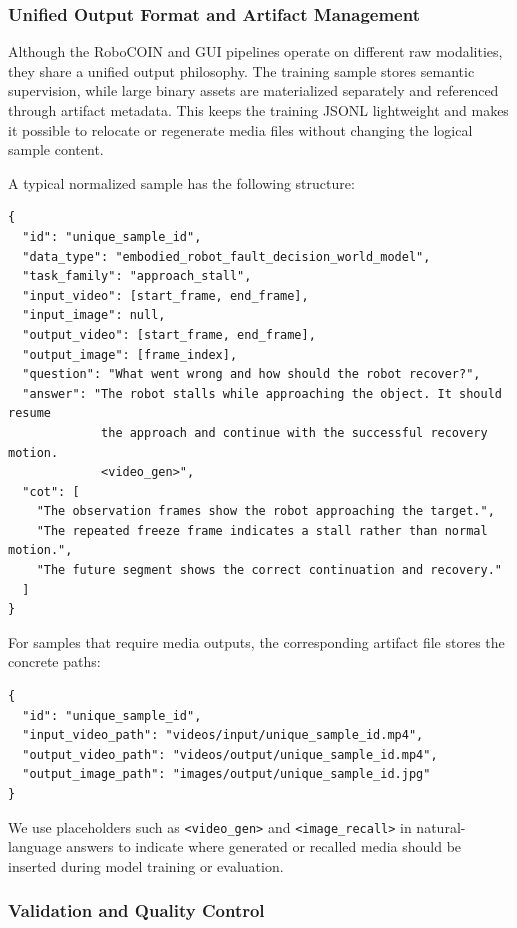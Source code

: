 \documentclass{llmxive}
\begin{document}
\subsubsection{Unified Output Format and Artifact Management}
\label{app:unified_output}

Although the RoboCOIN and GUI pipelines operate on different raw modalities, they share a unified output philosophy. The training sample stores semantic supervision, while large binary assets are materialized separately and referenced through artifact metadata. This keeps the training JSONL lightweight and makes it possible to relocate or regenerate media files without changing the logical sample content.

A typical normalized sample has the following structure:
\begin{verbatim}
{
  "id": "unique_sample_id",
  "data_type": "embodied_robot_fault_decision_world_model",
  "task_family": "approach_stall",
  "input_video": [start_frame, end_frame],
  "input_image": null,
  "output_video": [start_frame, end_frame],
  "output_image": [frame_index],
  "question": "What went wrong and how should the robot recover?",
  "answer": "The robot stalls while approaching the object. It should resume
             the approach and continue with the successful recovery motion.
             <video_gen>",
  "cot": [
    "The observation frames show the robot approaching the target.",
    "The repeated freeze frame indicates a stall rather than normal motion.",
    "The future segment shows the correct continuation and recovery."
  ]
}
\end{verbatim}

For samples that require media outputs, the corresponding artifact file stores the concrete paths:
\begin{verbatim}
{
  "id": "unique_sample_id",
  "input_video_path": "videos/input/unique_sample_id.mp4",
  "output_video_path": "videos/output/unique_sample_id.mp4",
  "output_image_path": "images/output/unique_sample_id.jpg"
}
\end{verbatim}

We use placeholders such as \texttt{<video\_gen>} and \texttt{<image\_recall>} in natural-language answers to indicate where generated or recalled media should be inserted during model training or evaluation.

\subsubsection{Validation and Quality Control}
\label{app:pipeline_validation}
\end{document}
